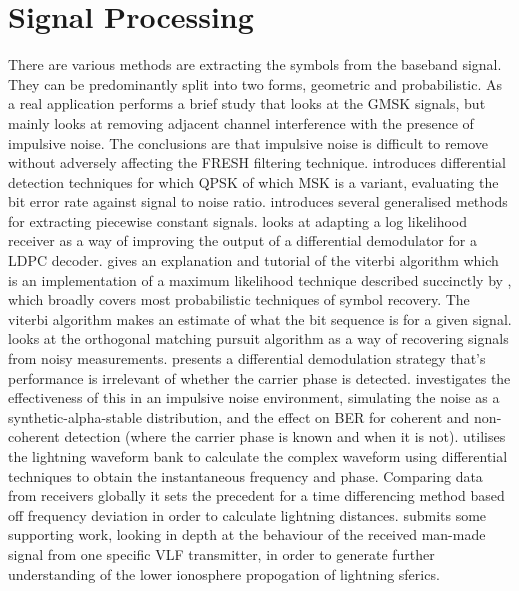 \section{Signal Processing}
There are various methods are extracting the symbols from the baseband signal. They can be predominantly split into two forms, geometric and probabilistic. 
As a real application \cite{Adlard1999} performs a brief study that looks at the GMSK signals, but mainly looks at removing adjacent channel interference with the presence of impulsive noise. The conclusions are that impulsive noise is difficult to remove without adversely affecting the FRESH filtering technique.
\cite{Park2011} introduces differential detection techniques for which QPSK of which MSK is a variant, evaluating the bit error rate against signal to noise ratio.
\cite{Little2011} introduces several generalised methods for extracting piecewise constant signals.
\cite{Wiklundh2015} looks at adapting a log likelihood receiver as a way of improving the output of a differential demodulator for a LDPC decoder. \cite{Forney1973} gives an explanation and tutorial of the viterbi algorithm which is an implementation of a maximum likelihood technique described succinctly by \cite{weisstein}, which broadly covers most probabilistic techniques of symbol recovery. The viterbi algorithm makes an estimate of what the bit sequence is for a given signal. \cite{Shen2015} looks at the orthogonal matching pursuit algorithm as a way of recovering signals from noisy measurements. \cite{Yue2016} presents a differential demodulation strategy that's performance is irrelevant of whether the carrier phase is detected.\cite{Yang2016} investigates the effectiveness of this in an impulsive noise environment, simulating the noise as a synthetic-alpha-stable distribution, and the effect on BER for coherent and non-coherent detection (where the carrier phase is known and when it is not). 
\cite{Liu2018} utilises the lightning waveform bank to calculate the complex waveform using differential techniques to obtain the instantaneous frequency and phase. Comparing data from receivers globally it sets the precedent for a time differencing method based off frequency deviation in order to calculate lightning distances. \cite{Koh2018} submits some supporting work, looking in depth at the behaviour of the received man-made signal from one specific VLF transmitter, in order to generate further understanding of the lower ionosphere propogation of lightning sferics.

